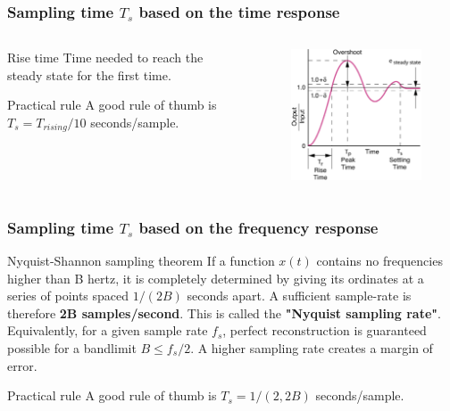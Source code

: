 \begin{frame}
	\frametitle{Sampling time $T_s$ based on the time response}
\begin{columns}
	\begin{column}{0.5\textwidth}
	\begin{block}{Rise time}
		Time needed to reach the steady state for the first time.
	\end{block}
	\begin{block}{Practical rule}
		A good rule of thumb is $T_s = T_{rising}/10$ seconds/sample.
	\end{block}
	\end{column}
	
	\begin{column}{0.5\textwidth}
		\begin{figure}
			\centering
			\includegraphics[width=1\linewidth]{rise_time}
		\end{figure}
	\end{column}
\end{columns}
\end{frame}

\begin{frame}
	\frametitle{Sampling time $T_s$ based on the frequency response}
	\begin{block}{Nyquist-Shannon sampling theorem}
		If a function $x(t)$ contains no frequencies higher than B hertz, it is completely determined by giving its ordinates at a series of points spaced $1/(2B)$ seconds apart. A sufficient sample-rate is therefore \textbf{2B samples/second}. This is called the \textbf{"Nyquist sampling rate"}. Equivalently, for a given sample rate $f_s$, perfect reconstruction is guaranteed possible for a bandlimit $B ≤ f_s/2$. A higher sampling rate creates a margin of error.
	\end{block}
	\begin{block}{Practical rule}
		A good rule of thumb is $T_s = 1/(2,2B)$ seconds/sample.
	\end{block}
\end{frame}

